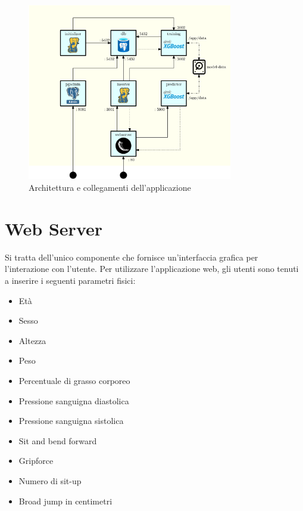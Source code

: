 \documentclass[12pt,a4paper]{report}
\begin{document}
\begin{figure}[H]
  \includegraphics[width=0.8\textwidth]{arch}
  \centering
  \caption{Architettura e collegamenti dell'applicazione}
\end{figure}

\section{Web Server}

Si tratta dell'unico componente che fornisce un'interfaccia grafica
per l'interazione con l'utente.
Per utilizzare l'applicazione web, gli utenti sono tenuti a inserire i seguenti parametri fisici:
\begin{itemize}
\item Età
\item Sesso
\item Altezza
\item Peso
\item Percentuale di grasso corporeo
\item Pressione sanguigna diastolica
\item Pressione sanguigna sistolica
\item Sit and bend forward
\item Gripforce
\item Numero di sit-up
\item Broad jump in centimetri
\end{itemize}
\end{document}
